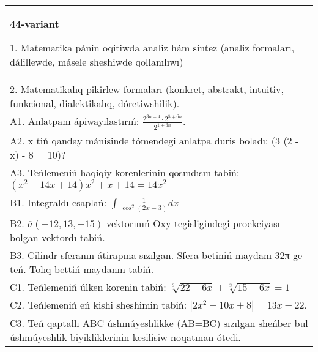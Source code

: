 \documentclass{article}
\begin{document}
\begin{tabular}{m{17cm}}
\textbf{44-variant}

1. Matematika pánin oqitiwda analiz hám sintez (analiz formaları, dálillewde, másele sheshiwde qollanılıwı) \\
2. Matematikalıq pikirlew formaları (konkret, abstrakt, intuitiv, funkcional, dialektikalıq, dóretiwshilik). \\
A1. Anlatpanı ápiwayılastırıń: \(\frac{2^{3n - 4} \cdot 2^{5 + 6n}}{2^{1 + 3n}}\). \\
A2. x tiń qanday mánisinde tómendegi anlatpa duris boladı: (3 (2 - x) - 8 = 10)? \\
A3. Teńlemeniń haqiqiy korenlerinin qosındısın tabiń: \((x^2 + 14x + 14) x^2 + x + 14 = 14x^2\) \\
B1. Integraldı esaplań: \(\int_{}^{}{\frac{1}{\cos^{2} (2x - 3) }dx}\) \\
B2. \(\overline{a} (- 12,13, - 15) \) vektorınıń Oxy tegisligindegi proekciyası bolgan vektordı tabiń. \\
B3. Cilindr sferanın átirapına sızılgan. Sfera betiniń maydanı 32π ge teń. Tolıq bettiń maydanın tabiń. \\
C1. Teńlemeniń úlken korenin tabiń: \(\sqrt[3]{22 + 6x} + \sqrt[3]{15 - 6x} = 1\) \\
C2. Teńlemeniń eń kishi sheshimin tabiń: \(\left| 2x^2 - 10x + 8 \right| = 13x - 22\). \\
C3. Teń qaptallı ABC úshmúyeshlikke (AB=BC) sızılgan sheńber bul úshmúyeshlik biyikliklerinin kesilisiw noqatınan ótedi. \\

\end{tabular}
\vspace{1cm}
\end{document}
